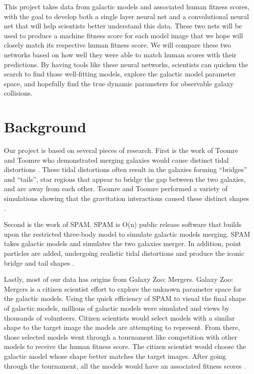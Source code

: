 \documentclass[conference]{IEEEtran}
\begin{document}
This project takes data from galactic models and associated
human fitness scores, with the goal to develop both a single layer 
neural net and a convolutional neural net that will help scientists better understand this
data. These two nets will be used to produce a machine fitness score for each model image
that we hope will closely match its respective human fitness score. We will compare these two networks based on how well they were able to match human scores with their predictions.
By having tools like these neural networks, scientists can
quicken the search to find those well-fitting models, explore
the galactic model parameter space, and hopefully find the
true dynamic parameters for observable galaxy collisions.

\section{Background}

Our project is based on several pieces of research. First is
the work of Toomre and Toomre who demonstrated merging
galaxies would cause distinct tidal distortions \cite{Toomre}. These tidal
distortions often result in the galaxies forming “bridges” and
“tails”, star regions that appear to bridge the gap between the
two galaxies, and arc away from each other. Toomre and
Toomre performed a variety of simulations showing that the
gravitation interactions caused these distinct shapes \cite{Toomre}.

Second is the work of SPAM. SPAM is O(n) public release
software that builds upon the restricted three-body model to
simulate galactic models merging. SPAM takes galactic
models and simulates the two galaxies merger. In addition,
point particles are added, undergoing realistic tidal distortions
and produce the iconic bridge and tail shapes \cite{WallinJSPAM}.

Lastly, most of our data has origins from Galaxy Zoo:
Mergers. Galaxy Zoo: Mergers is a citizen scientist effort to
explore the unknown parameter space for the galactic models.
Using the quick efficiency of SPAM to visual the final shape of
galactic models, millions of galactic models were simulated
and views by thousands of volunteers. Citizen scientists would
select models with a similar shape to the target image the
models are attempting to represent. From there, those
selected models went through a tournament like competition
with other models to receive the human fitness score. The
citizen scientist would choose the galactic model whose shape
better matches the target images. After going through the
tournament, all the models would have an associated fitness
scores \cite{WallinGalaxyZoo}.
\end{document}
